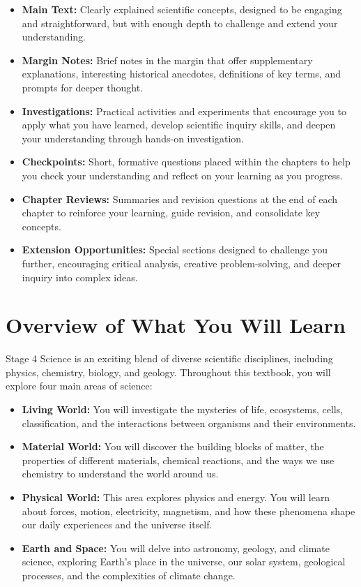 \begin{itemize}
    \item \textbf{Main Text:} Clearly explained scientific concepts, designed to be engaging and straightforward, but with enough depth to challenge and extend your understanding.
    \item \textbf{Margin Notes:} Brief notes in the margin that offer supplementary explanations, interesting historical anecdotes, definitions of key terms, and prompts for deeper thought.
    \item \textbf{Investigations:} Practical activities and experiments that encourage you to apply what you have learned, develop scientific inquiry skills, and deepen your understanding through hands-on investigation.
    \item \textbf{Checkpoints:} Short, formative questions placed within the chapters to help you check your understanding and reflect on your learning as you progress.
    \item \textbf{Chapter Reviews:} Summaries and revision questions at the end of each chapter to reinforce your learning, guide revision, and consolidate key concepts.
    \item \textbf{Extension Opportunities:} Special sections designed to challenge you further, encouraging critical analysis, creative problem-solving, and deeper inquiry into complex ideas.
\end{itemize}

\section{Overview of What You Will Learn}

Stage 4 Science is an exciting blend of diverse scientific disciplines, including physics, chemistry, biology, and geology. Throughout this textbook, you will explore four main areas of science:

\begin{itemize}
    \item \textbf{Living World:} You will investigate the mysteries of life, ecosystems, cells, classification, and the interactions between organisms and their environments.
    
    \item \textbf{Material World:} You will discover the building blocks of matter, the properties of different materials, chemical reactions, and the ways we use chemistry to understand the world around us.
    \item \textbf{Physical World:} This area explores physics and energy. You will learn about forces, motion, electricity, magnetism, and how these phenomena shape our daily experiences and the universe itself.
    \item \textbf{Earth and Space:} You will delve into astronomy, geology, and climate science, exploring Earth's place in the universe, our solar system, geological processes, and the complexities of climate change.
\end{itemize}

